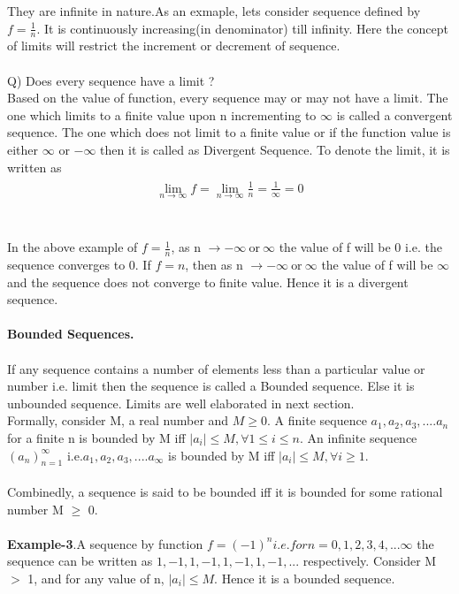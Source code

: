 \documentclass[a4paper]{article}
\begin{document}
They are infinite in nature.As an exmaple, lets consider sequence defined by $f=\frac{1}{n}$. It is continuously increasing(in denominator) till infinity. Here the concept of limits will restrict the increment or decrement of sequence.
\\
\\
Q) Does every sequence have a limit ?\\
Based on the value of function,  every sequence may or may not have a limit. The one which limits to a finite value upon n incrementing to $\infty$ is called a convergent sequence. The one which does not limit to a finite value or if the function value is either $\infty$ or $-\infty$ then it is called as Divergent Sequence. To denote the limit, it is written as
\\
\begin{align}
\begin{split}
\lim_{n \to \infty} f= \lim_{n \to \infty} \frac{1}{n} = \frac{1}{\infty} = 0
\end{split}
\end{align}
\\
\\
In the above example of $f=\frac{1}{n}$, as n $\to -\infty\  \text{or}\  \infty$ the value of f will be 0 i.e. the sequence converges to 0. If $f={n}$, then as n $\to -\infty\  \text{or}\  \infty$ the value of f will be $\infty$ and the sequence does not converge to finite value. Hence it is a divergent sequence. 
\\
\\
\textbf{Bounded Sequences.}
\\
\\
If any sequence contains a number of elements less than a particular value or number i.e. limit then the sequence is called a Bounded sequence. Else it is unbounded sequence. Limits are well elaborated in next section. \\
Formally, consider M, a real number and $M\geq0$. A finite sequence $a_1,a_2,a_3,....a_n$ for a finite n is bounded by M iff $\mid a_i \mid \leq M , \forall 1 \leq i \leq n$. 
 An infinite sequence $(a_n)^{\infty}_{n=1}$ i.e.$a_1,a_2,a_3,....a_\infty$ is bounded by M iff $\mid a_i \mid \leq M , \forall i \geq 1$. \\
 \\
Combinedly, a sequence is said to be bounded iff it is bounded for some rational number M $\geq$ 0.
\\
\\
\textbf{Example-3}.A sequence by function $f=(-1)^n i.e. for n=0, 1 ,2,3,4,...\infty$ the sequence can be written as $1,-1,1,-1,1,-1,1,-1,...$ respectively. Consider M $>$ 1, and for any value of n, $\mid a_i \mid \leq M $. Hence it is a bounded sequence.
\end{document}
